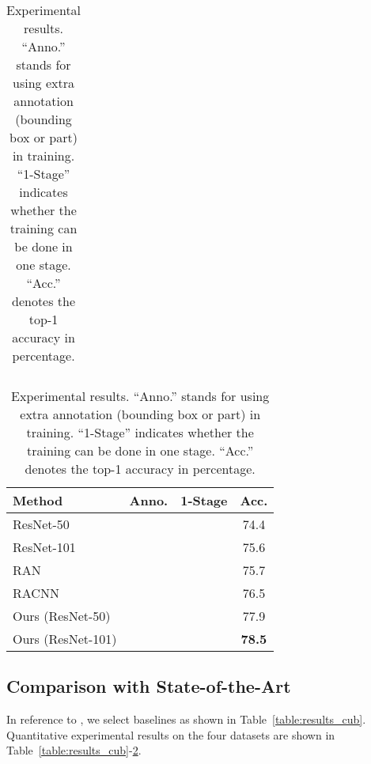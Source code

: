 \documentclass[runningheads]{llncs}
\begin{document}
\begin{table}[p]
\begin{minipage}[p]{0.48\linewidth}
\begin{subtable}[t]{\textwidth}
\begin{tabular}{lccc}
	\bottomrule
	\end{tabular}
        \caption{Stanford Cars.}
        \label{table:results_stanford_cars}
      \end{subtable}
      \begin{subtable}[b]{\textwidth}
	\begin{tabular}{lccc}
	\toprule
	Method & Anno. & 1-Stage & Acc.\\
	\midrule
	ResNet-50 \cite{he2016deep} &  & \checkmark & 74.4\\
	ResNet-101 \cite{he2016deep} &  & \checkmark & 75.6\\
	RAN \cite{wang2017residual} &  &  & 75.7\\
	RACNN \cite{fu2017look} &  &  & 76.5\\
	\midrule
	Ours (ResNet-50) &  & \checkmark & 77.9\\
	Ours (ResNet-101) &  & \checkmark & \bf78.5\\
	\bottomrule
	\end{tabular}
        \caption{Dogs-in-the-Wild.}
        \label{table:results_dogs-in-the-wild}
      \end{subtable}
      \end{minipage}
      \caption{Experimental results. ``Anno.'' stands for using extra annotation (bounding box or part) in training. ``1-Stage'' indicates whether the training can be done in one stage. ``Acc.'' denotes the top-1 accuracy in percentage.}
\end{table}


\vspace{-.1in}
\subsection{Comparison with State-of-the-Art}

In reference to \cite{fu2017look}, we select  baselines as shown in Table~\ref{table:results_cub}.
Quantitative experimental results on the four datasets are shown in Table~\ref{table:results_cub}-\ref{table:results_dogs-in-the-wild}.
\end{document}
